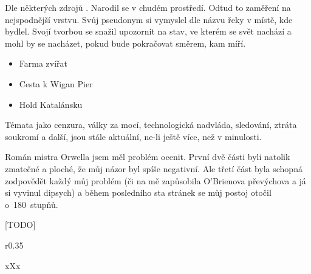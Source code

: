 \documentclass{extarticle} %
\begin{document}
\noindent 
Dle některých zdrojů . Narodil se v chudém prostředí. Odtud to zaměření na nejspodnější vrstvu. Svůj pseudonym si vymyslel dle názvu řeky v místě, kde bydlel. Svojí tvorbou se snažil upozornit na stav, ve kterém se svět nachází a mohl by se nacházet, pokud bude pokračovat směrem, kam míří.


\noindent 
\begin{itemize}
    \item Farma zvířat
    \item Cesta k Wigan Pier
    \item Hold Katalánsku
\end{itemize}




\noindent
Témata jako cenzura, války za mocí, technologická nadvláda, sledování, ztráta soukromí a další, jsou stále aktuální, ne-li ještě více, než v minulosti.


\noindent 
Román mistra Orwella jsem měl problém ocenit. První dvě části byli natolik zmatečné a ploché, že můj názor byl spíše negativní. Ale třetí část byla schopná zodpovědět každý můj problém (či na mě zapůsobila O’Brienova převýchova a já si vyvinul dipsych) a během posledního sta stránek se můj postoj otočil o~180~stupňů.



\vfill


\newpage


\changefontsize{8pt}

[TODO]

\noindent\begin{wrapfigure}{r}{0.35\textwidth}
\tiny

\setlength{\parindent}{3pt}
xXx
\end{wrapfigure}
\end{document}
